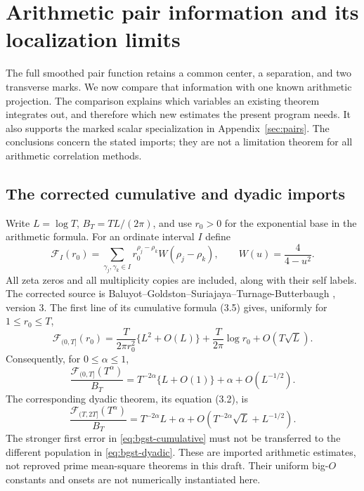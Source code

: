 \section{Arithmetic pair information and its localization limits}\label{sec:arithmetic}

The full smoothed pair function retains a common center, a separation,
and two transverse marks. We now compare that information with one known
arithmetic projection. The comparison explains which variables an existing
theorem integrates out, and therefore which new estimates the present
program needs. It also supports the marked scalar specialization in
Appendix~\ref{sec:pairs}. The conclusions concern the stated imports;
they are not a limitation theorem for all arithmetic correlation methods.

\subsection{The corrected cumulative and dyadic imports}

Write $L=\log T$, $B_T=TL/(2\pi)$, and use $r_0>0$ for the
exponential base in the arithmetic formula. For an ordinate interval
$I$ define
\begin{equation}\label{eq:arithmetic-F}
 \mathcal F_I(r_0)=
 \sum_{\gamma_j,\gamma_k\in I}
       r_0^{\rho_j-\rho_k}W(\rho_j-\rho_k),
 \qquad W(u)=\frac4{4-u^2}.
\end{equation}
All zeta zeros and all multiplicity copies are included, along
with their self labels. The corrected source is
Baluyot--Goldston--Suriajaya--Turnage-Butterbaugh
\cite[Section 3]{BGST2026PairI}, version 3.
The first line of its cumulative formula (3.5) gives, uniformly
for $1\le r_0\le T$,
\begin{equation}\label{eq:bgst-cumulative-raw}
 \mathcal F_{(0,T]}(r_0)
 =\frac{T}{2\pi r_0^2}\{L^2+O(L)\}
       +\frac{T}{2\pi}\log r_0+O(T\sqrt L).
\end{equation}
Consequently, for $0\le\alpha\le1$,
\begin{equation}\label{eq:bgst-cumulative}
 \frac{\mathcal F_{(0,T]}(T^\alpha)}{B_T}
 =T^{-2\alpha}\{L+O(1)\}+\alpha+O(L^{-1/2}).
\end{equation}
The corresponding dyadic theorem, its equation (3.2), is
\begin{equation}\label{eq:bgst-dyadic}
 \frac{\mathcal F_{(T,2T]}(T^\alpha)}{B_T}
 =T^{-2\alpha}L+\alpha
       +O(T^{-2\alpha}\sqrt L+L^{-1/2}).
\end{equation}
The stronger first error in \eqref{eq:bgst-cumulative} must not
be transferred to the different population in
\eqref{eq:bgst-dyadic}. These are imported arithmetic estimates,
not reproved prime mean-square theorems in this draft. Their
uniform big-$O$ constants and onsets are not numerically
instantiated here.

